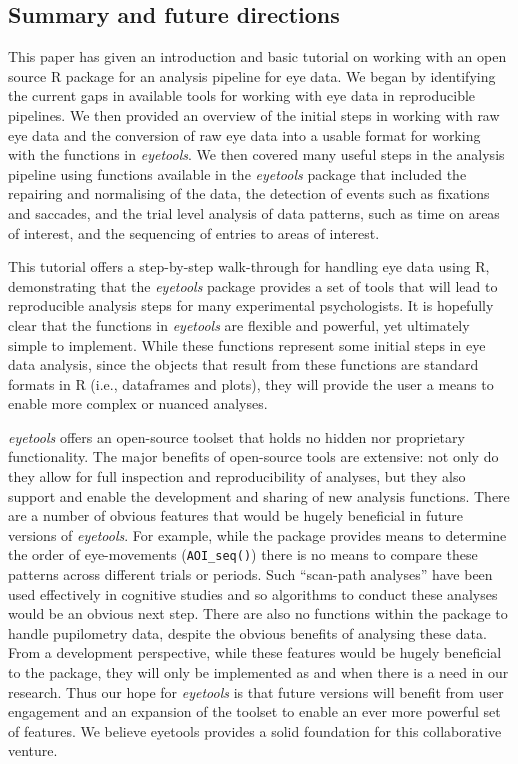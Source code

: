 \documentclass[
  man,
  floatsintext,
  longtable,
  nolmodern,
  notxfonts,
  notimes,
  colorlinks=true,linkcolor=blue,citecolor=blue,urlcolor=blue]{apa7}
\begin{document}
\subsection{Summary and future
directions}\label{summary-and-future-directions}

This paper has given an introduction and basic tutorial on working with
an open source R package for an analysis pipeline for eye data. We began
by identifying the current gaps in available tools for working with eye
data in reproducible pipelines. We then provided an overview of the
initial steps in working with raw eye data and the conversion of raw eye
data into a usable format for working with the functions in
\emph{eyetools}. We then covered many useful steps in the analysis
pipeline using functions available in the \emph{eyetools} package that
included the repairing and normalising of the data, the detection of
events such as fixations and saccades, and the trial level analysis of
data patterns, such as time on areas of interest, and the sequencing of
entries to areas of interest.

This tutorial offers a step-by-step walk-through for handling eye data
using R, demonstrating that the \emph{eyetools} package provides a set
of tools that will lead to reproducible analysis steps for many
experimental psychologists. It is hopefully clear that the functions in
\emph{eyetools} are flexible and powerful, yet ultimately simple to
implement. While these functions represent some initial steps in eye
data analysis, since the objects that result from these functions are
standard formats in R (i.e., dataframes and plots), they will provide
the user a means to enable more complex or nuanced analyses.

\emph{eyetools} offers an open-source toolset that holds no hidden nor
proprietary functionality. The major benefits of open-source tools are
extensive: not only do they allow for full inspection and
reproducibility of analyses, but they also support and enable the
development and sharing of new analysis functions. There are a number of
obvious features that would be hugely beneficial in future versions of
\emph{eyetools}. For example, while the package provides means to
determine the order of eye-movements (\texttt{AOI\_seq()}) there is no
means to compare these patterns across different trials or periods. Such
``scan-path analyses'' have been used effectively in cognitive studies
and so algorithms to conduct these analyses would be an obvious next
step. There are also no functions within the package to handle
pupilometry data, despite the obvious benefits of analysing these data.
From a development perspective, while these features would be hugely
beneficial to the package, they will only be implemented as and when
there is a need in our research. Thus our hope for \emph{eyetools} is
that future versions will benefit from user engagement and an expansion
of the toolset to enable an ever more powerful set of features. We
believe eyetools provides a solid foundation for this collaborative
venture.
\end{document}

